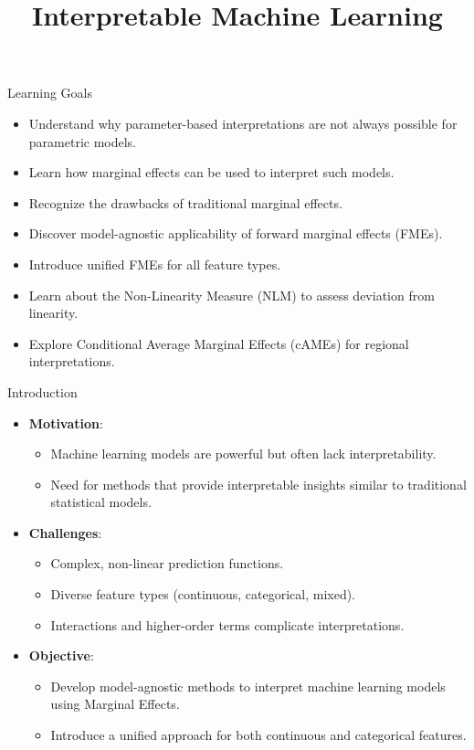 \documentclass[10pt,compress,t,notes=noshow, xcolor=table]{beamer}
\title{Interpretable Machine Learning}
\date{}
\begin{document}


\begin{frame}{Learning Goals}
\begin{itemize}
\item Understand why parameter-based interpretations are not always possible for parametric models.
\item Learn how marginal effects can be used to interpret such models.
\item Recognize the drawbacks of traditional marginal effects.
\item Discover model-agnostic applicability of forward marginal effects (FMEs).
\item Introduce unified FMEs for all feature types.
\item Learn about the Non-Linearity Measure (NLM) to assess deviation from linearity.
\item Explore Conditional Average Marginal Effects (cAMEs) for regional interpretations.
\end{itemize}
\end{frame}


\begin{frame}{Introduction}
\begin{itemize}
\item \textbf{Motivation}:
\begin{itemize}
  \item Machine learning models are powerful but often lack interpretability.
  \item Need for methods that provide interpretable insights similar to traditional statistical models.
\end{itemize}
\item \textbf{Challenges}:
\begin{itemize}
  \item Complex, non-linear prediction functions.
  \item Diverse feature types (continuous, categorical, mixed).
  \item Interactions and higher-order terms complicate interpretations.
\end{itemize}
\item \textbf{Objective}:
\begin{itemize}
  \item Develop model-agnostic methods to interpret machine learning models using Marginal Effects.
  \item Introduce a unified approach for both continuous and categorical features.
\end{itemize}
\end{itemize}
\end{frame}
\end{document}
